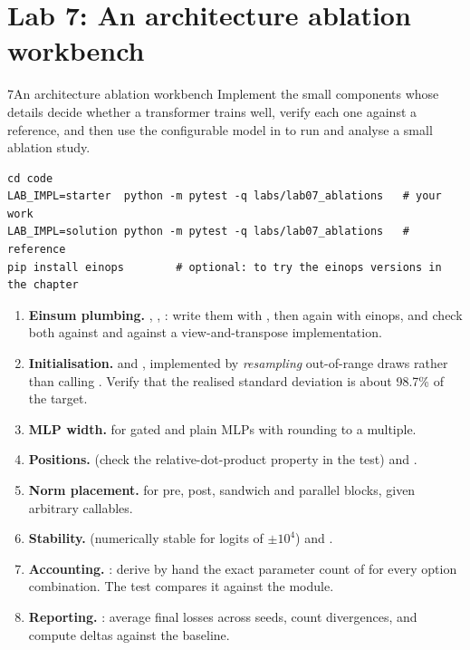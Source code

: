 \section{Lab 7: An architecture ablation workbench}\label{sec:archdesign:lab}
\begin{labbox}{7}{An architecture ablation workbench}
Implement the small components whose details decide whether a transformer trains well, verify each one
against a reference, and then use the configurable model in  to run and analyse a
small ablation study.

\begin{lstlisting}[style=shell]
cd code
LAB_IMPL=starter  python -m pytest -q labs/lab07_ablations   # your work
LAB_IMPL=solution python -m pytest -q labs/lab07_ablations   # reference
pip install einops        # optional: to try the einops versions in the chapter
\end{lstlisting}

\begin{enumerate}
\item \textbf{Einsum plumbing.} , , : write
  them with , then again with einops, and check both against  and
  against a view-and-transpose implementation.
\item \textbf{Initialisation.}  and , implemented by
  \emph{resampling} out-of-range draws rather than calling . Verify that
  the realised standard deviation is about 98.7\% of the target.
\item \textbf{MLP width.}  for gated and plain MLPs with rounding to a multiple.
\item \textbf{Positions.}  (check the relative-dot-product property in the
  test) and .
\item \textbf{Norm placement.}  for pre, post, sandwich and parallel blocks, given
  arbitrary callables.
\item \textbf{Stability.}  (numerically stable for logits of $\pm10^4$) and
  .
\item \textbf{Accounting.} : derive by hand the exact parameter count of
   for every option combination. The test compares it against the module.
\item \textbf{Reporting.} : average final losses across seeds, count
  divergences, and compute deltas against the baseline.
\end{enumerate}


\end{labbox}
